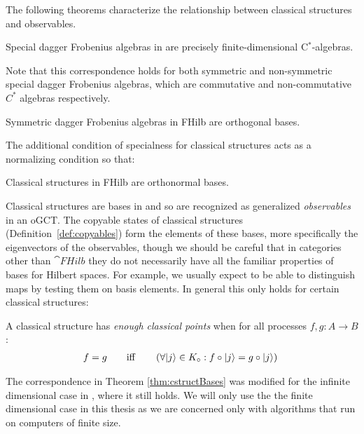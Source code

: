 The following theorems characterize the relationship between classical structures and observables. 

\begin{theorem}
Special dagger Frobenius algebras in  are precisely finite-dimensional C$^*$-algebras.
\end{theorem}
\noindent Note that this correspondence holds for both symmetric and non-symmetric special dagger Frobenius algebras, which are commutative and non-commutative $C^*$ algebras respectively.

\begin{theorem}
Symmetric dagger Frobenius algebras in FHilb are orthogonal bases.
\end{theorem}
\noindent The additional condition of specialness for classical structures acts as a normalizing condition so that:
\begin{theorem}
\label{thm:cstructBases}
Classical structures in FHilb are orthonormal bases.
\end{theorem}

\noindent \noindent Classical structures are bases in  and so are recognized as generalized \emph{observables} in an oGCT. The copyable states of classical structures  (Definition~\ref{def:copyables}) form the elements of these bases, more specifically the eigenvectors of the observables, though we should be careful that in categories other than $\cat{FHilb}$ they do not necessarily have all the familiar properties of bases for Hilbert spaces.  For example, we usually expect to be able to distinguish maps by testing them on basis elements. In general this only holds for certain classical structures:

\begin{defn}
\label{def:enoughclassicalpoints}
A classical structure has \emph{enough classical points} when for all processes $f,g:A\to B$: 
\begin{align}
f=g \qquad \mbox{iff}\qquad \left(\forall | j \rangle\in K_{\circ}:f\circ| j \rangle=g\circ| j \rangle\right)\; 
\end{align}
\end{defn}

\begin{remark}
The correspondence in Theorem \ref{thm:cstructBases} was modified for the infinite dimensional case in \cite{abramsky2012h}, where it still holds. We will only use the the finite dimensional case in this thesis as we are concerned only with algorithms that run on computers of finite size.
\end{remark}

